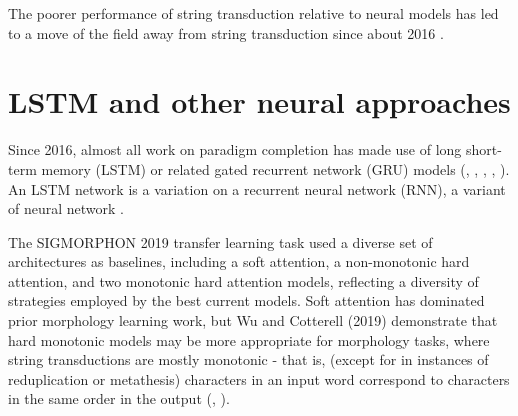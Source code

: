 The poorer performance of string transduction relative to neural models has led to a move of the field away from string transduction since about 2016 \parencite{Cotterell2018b}.

\section{LSTM and other neural approaches}

Since 2016, almost all work on paradigm completion has made use of long short-term memory (LSTM) or related gated recurrent network (GRU) models (\cite{Faruqui2015}, \cite{Cotterell2016}, \cite{Cotterell2017a}, \cite{Cotterell2018b}, \cite{McCarthy2019}). An LSTM network is a variation on a recurrent neural network (RNN), a variant of neural network \parencite{Hochreiter1997}.

The SIGMORPHON 2019 transfer learning task used a diverse set of architectures as baselines, including a soft attention, a non-monotonic hard attention, and two monotonic hard attention models, reflecting a diversity of strategies employed by the best current models. Soft attention has dominated prior morphology learning work, but Wu and Cotterell (2019) demonstrate that hard monotonic models may be more appropriate for morphology tasks, where string transductions are mostly monotonic - that is, (except for in instances of reduplication or metathesis) characters in an input word correspond to characters in the same order in the output (\cite{McCarthy2019}, \cite{Wu2019}).
